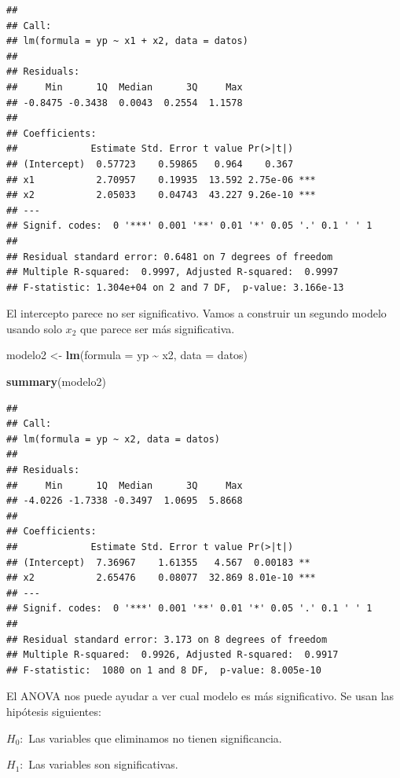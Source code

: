 \documentclass[
]{book}
\newenvironment{Shaded}{\begin{snugshade}}{\end{snugshade}}
\newcommand{\AttributeTok}[1]{\textcolor[rgb]{0.13,0.29,0.53}{#1}}
\newcommand{\FunctionTok}[1]{\textcolor[rgb]{0.13,0.29,0.53}{\textbf{#1}}}
\newcommand{\NormalTok}[1]{#1}
\newcommand{\OtherTok}[1]{\textcolor[rgb]{0.56,0.35,0.01}{#1}}
\newcommand{\SpecialCharTok}[1]{\textcolor[rgb]{0.81,0.36,0.00}{\textbf{#1}}}
\begin{document}
\begin{verbatim}
## 
## Call:
## lm(formula = yp ~ x1 + x2, data = datos)
## 
## Residuals:
##     Min      1Q  Median      3Q     Max 
## -0.8475 -0.3438  0.0043  0.2554  1.1578 
## 
## Coefficients:
##             Estimate Std. Error t value Pr(>|t|)    
## (Intercept)  0.57723    0.59865   0.964    0.367    
## x1           2.70957    0.19935  13.592 2.75e-06 ***
## x2           2.05033    0.04743  43.227 9.26e-10 ***
## ---
## Signif. codes:  0 '***' 0.001 '**' 0.01 '*' 0.05 '.' 0.1 ' ' 1
## 
## Residual standard error: 0.6481 on 7 degrees of freedom
## Multiple R-squared:  0.9997, Adjusted R-squared:  0.9997 
## F-statistic: 1.304e+04 on 2 and 7 DF,  p-value: 3.166e-13
\end{verbatim}

El intercepto parece no ser significativo. Vamos a construir un segundo modelo usando solo \(x_2\) que parece ser más significativa.

\begin{Shaded}
\begin{Highlighting}[]
\NormalTok{modelo2 }\OtherTok{\textless{}{-}} \FunctionTok{lm}\NormalTok{(}\AttributeTok{formula =}\NormalTok{ yp }\SpecialCharTok{\textasciitilde{}}\NormalTok{ x2, }\AttributeTok{data =}\NormalTok{ datos)}

\FunctionTok{summary}\NormalTok{(modelo2)}
\end{Highlighting}
\end{Shaded}

\begin{verbatim}
## 
## Call:
## lm(formula = yp ~ x2, data = datos)
## 
## Residuals:
##     Min      1Q  Median      3Q     Max 
## -4.0226 -1.7338 -0.3497  1.0695  5.8668 
## 
## Coefficients:
##             Estimate Std. Error t value Pr(>|t|)    
## (Intercept)  7.36967    1.61355   4.567  0.00183 ** 
## x2           2.65476    0.08077  32.869 8.01e-10 ***
## ---
## Signif. codes:  0 '***' 0.001 '**' 0.01 '*' 0.05 '.' 0.1 ' ' 1
## 
## Residual standard error: 3.173 on 8 degrees of freedom
## Multiple R-squared:  0.9926, Adjusted R-squared:  0.9917 
## F-statistic:  1080 on 1 and 8 DF,  p-value: 8.005e-10
\end{verbatim}

El ANOVA nos puede ayudar a ver cual modelo es más significativo. Se usan las hipótesis siguientes:

\(H_0:\) Las variables que eliminamos no tienen significancia.

\(H_1:\) Las variables son significativas.
\end{document}
